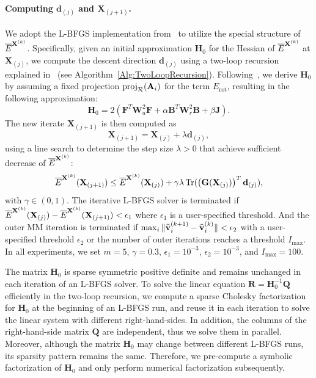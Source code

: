 \paragraph{Computing $\mathbf{d}_{(j)}$ and $\mathbf{X}_{(j+1)}$.}
We adopt the L-BFGS implementation from~\cite{liu2017quasi} to utilize the special structure of $\overline{E}^{\mathbf{X}^{(k)}}$.
Specifically, given an initial approximation $\mathbf{H}_{0}$ for the Hessian of $\overline{E}^{\mathbf{X}^{(k)}}$ at $\mathbf{X}_{(j)}$,
we compute the descent direction $\mathbf{d}_{(j)}$ using a two-loop recursion explained in~\cite{liu2017quasi} (see Algorithm~\ref{Alg:TwoLoopRecursion}).
Following~\cite{liu2017quasi}, we derive $\mathbf{H}_{0}$ by assuming a fixed projection $\operatorname*{proj}_{\mathcal{R}}(\mathbf{A}_i)$ for the term $E_{\text{rot}}$, resulting in the following approximation:
\begin{equation}
    \mathbf{H}_0 = 2 (\mathbf{F}^T \mathbf{W}_a^2 \mathbf{F}
    + \alpha \mathbf{B}^T \mathbf{W}_r^2\mathbf{B}
    +  \beta \mathbf{J}).
    \label{eq:InitialHessian}
\end{equation}
The new iterate $\mathbf{X}_{(j+1)}$ is then computed as
\[
    \mathbf{X}_{(j+1)} = \mathbf{X}_{(j)} + \lambda \mathbf{d}_{(j)},
\]
using a line search to determine the step size $\lambda > 0$ that achieve sufficient decrease of $\overline{E}^{\mathbf{X}^{(k)}}$:
\begin{equation}
    \overline{E}^{\mathbf{X}^{(k)}}(\mathbf{X}_{(j+1)})
    \leq
    \overline{E}^{\mathbf{X}^{(k)}}(\mathbf{X}_{(j)}) +
    \gamma \lambda \operatorname{Tr}(\left(\mathbf{G}(\mathbf{X}_{(j)})\right)^T \mathbf{d}_{(j)}),
    \label{eq:SufficientDecrease}
\end{equation}
with $\gamma  \in (0, 1)$.
The iterative L-BFGS solver is terminated if $\overline{E}^{\mathbf{X}^{(k)}}(\mathbf{X}_{(j)}) - \overline{E}^{\mathbf{X}^{(k)}}(\mathbf{X}_{(j+1)}) < \epsilon_1$ where $\epsilon_1$ is a user-specified threshold. And the outer MM iteration is terminated if $\max_i\|\widehat{\mathbf{v}}^{(k+1)}_i - \widehat{\mathbf{v}}^{(k)}_i\| < \epsilon_2$ with a user-specified threshold $\epsilon_2$ or the number of outer iterations reaches a threshold $I_{\max}$.
In all experiments, we set $m = 5$, $\gamma = 0.3$, $\epsilon_1 = 10^{-3}$, $\epsilon_2 = 10^{-3}$, and $I_{\max} = 100$.

The matrix $\mathbf{H}_0$ is sparse symmetric positive definite and remains unchanged in each iteration of an L-BFGS solver. To solve the linear equation $\mathbf{R} = \mathbf{H}_0^{-1} \mathbf{Q}$ efficiently in the two-loop recursion, we compute a sparse Cholesky factorization for $\mathbf{H}_0$ at the beginning of an L-BFGS run, and reuse it in each iteration to solve the linear system with different right-hand-sides. In addition, the columns of the right-hand-side matrix $\mathbf{Q}$ are independent, thus we solve them in parallel. Moreover, although the matrix $\mathbf{H}_0$ may change between different L-BFGS runs, its sparsity pattern remains the same. Therefore, we pre-compute a symbolic factorization of $\mathbf{H}_0$ and only perform numerical factorization subsequently.

